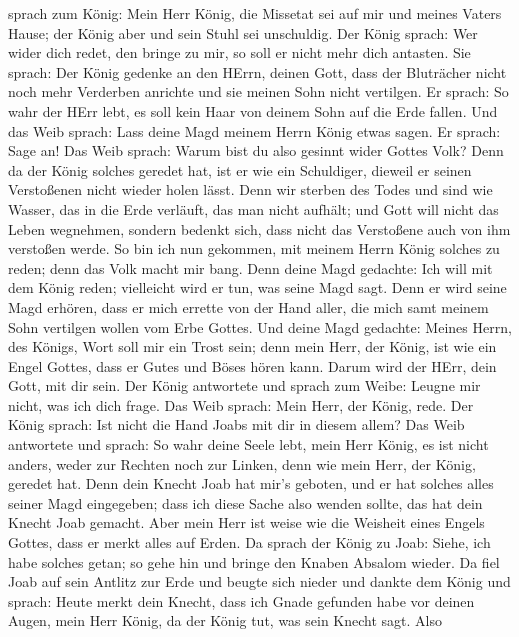 sprach zum König: Mein Herr König, die Missetat sei auf mir und meines
Vaters Hause; der König aber und sein Stuhl sei unschuldig.
 Der König sprach: Wer wider dich redet, den bringe zu mir,
so soll er nicht mehr dich antasten.  Sie sprach: Der König
gedenke an den HErrn, deinen Gott, dass der Bluträcher nicht noch mehr
Verderben anrichte und sie meinen Sohn nicht vertilgen. Er sprach: So
wahr der HErr lebt, es soll kein Haar von deinem Sohn auf die Erde
fallen.  Und das Weib sprach: Lass deine Magd meinem Herrn
König etwas sagen. Er sprach: Sage an!  Das Weib sprach:
Warum bist du also gesinnt wider Gottes Volk? Denn da der König solches
geredet hat, ist er wie ein Schuldiger, dieweil er seinen Verstoßenen
nicht wieder holen lässt.  Denn wir sterben des Todes und
sind wie Wasser, das in die Erde verläuft, das man nicht aufhält; und
Gott will nicht das Leben wegnehmen, sondern bedenkt sich, dass nicht
das Verstoßene auch von ihm verstoßen werde.  So bin ich
nun gekommen, mit meinem Herrn König solches zu reden; denn das Volk
macht mir bang. Denn deine Magd gedachte: Ich will mit dem König reden;
vielleicht wird er tun, was seine Magd sagt.  Denn er wird
seine Magd erhören, dass er mich errette von der Hand aller, die mich
samt meinem Sohn vertilgen wollen vom Erbe Gottes.  Und
deine Magd gedachte: Meines Herrn, des Königs, Wort soll mir ein Trost
sein; denn mein Herr, der König, ist wie ein Engel Gottes, dass er Gutes
und Böses hören kann. Darum wird der HErr, dein Gott, mit dir sein.
 Der König antwortete und sprach zum Weibe: Leugne mir
nicht, was ich dich frage. Das Weib sprach: Mein Herr, der König, rede.
 Der König sprach: Ist nicht die Hand Joabs mit dir in
diesem allem? Das Weib antwortete und sprach: So wahr deine Seele lebt,
mein Herr König, es ist nicht anders, weder zur Rechten noch zur Linken,
denn wie mein Herr, der König, geredet hat. Denn dein Knecht Joab hat
mir's geboten, und er hat solches alles seiner Magd eingegeben;
 dass ich diese Sache also wenden sollte, das hat dein
Knecht Joab gemacht. Aber mein Herr ist weise wie die Weisheit eines
Engels Gottes, dass er merkt alles auf Erden.  Da sprach
der König zu Joab: Siehe, ich habe solches getan; so gehe hin und bringe
den Knaben Absalom wieder.  Da fiel Joab auf sein Antlitz
zur Erde und beugte sich nieder und dankte dem König und sprach: Heute
merkt dein Knecht, dass ich Gnade gefunden habe vor deinen Augen, mein
Herr König, da der König tut, was sein Knecht sagt.  Also
